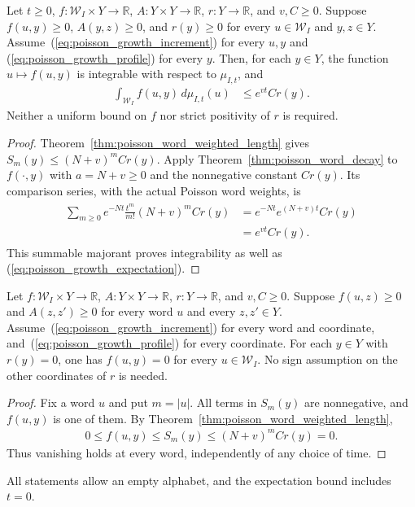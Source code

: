 \begin{theorem}
\label{thm:poisson_word_weighted_expectation}
\leanok
{}
Let $t\geq0$, $f:\mathcal W_I\times Y\to\mathbb R$,
$A:Y\times Y\to\mathbb R$, $r:Y\to\mathbb R$, and $v,C\geq0$.
Suppose $f(u,y)\geq0$, $A(y,z)\geq0$, and $r(y)\geq0$ for every
$u\in\mathcal W_I$ and $y,z\in Y$.
Assume~(\ref{eq:poisson_growth_increment}) for every $u,y$ and
(\ref{eq:poisson_growth_profile}) for every $y$.
Then, for each $y\in Y$, the function $u\mapsto f(u,y)$ is integrable
with respect to $\mu_{I,t}$, and
\begin{align}
 \int_{\mathcal W_I}f(u,y)\,d\mu_{I,t}(u)
 &\leq e^{vt}C r(y).
 \label{eq:poisson_growth_expectation}
\end{align}
Neither a uniform bound on $f$ nor strict positivity of $r$ is required.
\end{theorem}
\begin{proof}
\leanok
{}
Theorem~\ref{thm:poisson_word_weighted_length} gives
$S_m(y)\leq(N+v)^m C r(y)$.
Apply Theorem~\ref{thm:poisson_word_decay} to $f(\cdot,y)$ with
$a=N+v\geq0$ and the nonnegative constant $C r(y)$.
Its comparison series, with the actual Poisson word weights, is
\begin{align}
 \begin{aligned}
 \sum_{m\geq0}e^{-Nt}\frac{t^m}{m!}(N+v)^m C r(y)
 &=e^{-Nt}e^{(N+v)t}C r(y)\\
 &=e^{vt}C r(y).
 \end{aligned}
 \label{eq:poisson_growth_exponential}
\end{align}
This summable majorant proves integrability as well as
(\ref{eq:poisson_growth_expectation}).
\end{proof}

\begin{theorem}
\label{thm:poisson_word_weighted_zero}
\leanok
{}
Let $f:\mathcal W_I\times Y\to\mathbb R$,
$A:Y\times Y\to\mathbb R$, $r:Y\to\mathbb R$, and $v,C\geq0$.
Suppose $f(u,z)\geq0$ and $A(z,z')\geq0$ for every word $u$ and
every $z,z'\in Y$.
Assume~(\ref{eq:poisson_growth_increment}) for every word and coordinate,
and~(\ref{eq:poisson_growth_profile}) for every coordinate.
For each $y\in Y$ with $r(y)=0$, one has $f(u,y)=0$ for every
$u\in\mathcal W_I$.
No sign assumption on the other coordinates of $r$ is needed.
\end{theorem}
\begin{proof}
\leanok
{}
Fix a word $u$ and put $m=|u|$.
All terms in $S_m(y)$ are nonnegative, and $f(u,y)$ is one of them.
By Theorem~\ref{thm:poisson_word_weighted_length},
\begin{align}
 0\leq f(u,y)\leq S_m(y)\leq (N+v)^m C r(y)=0.
 \label{eq:poisson_growth_zero}
\end{align}
Thus vanishing holds at every word, independently of any choice of time.
\end{proof}

All statements allow an empty alphabet, and the expectation bound includes
$t=0$.
